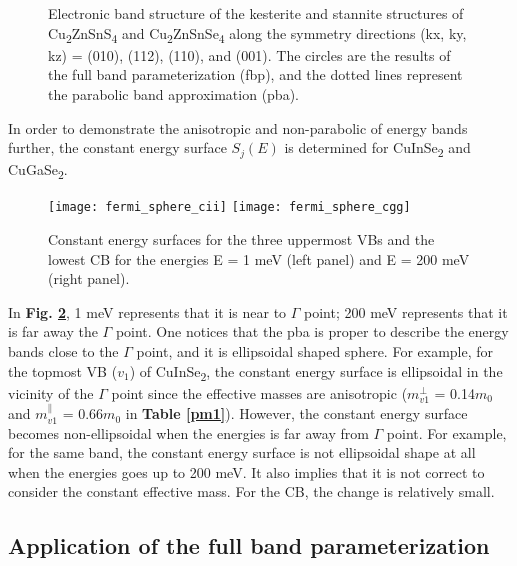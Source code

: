 \documentclass[a4paper, 12pt, titlepage,oneside,drop]{kthesis}
\begin{document}
\begin{figure}[H]
\begin{center}
     \end{center}
    \caption{ Electronic band structure of the kesterite and stannite structures of Cu\textsubscript{2}ZnSnS\textsubscript{4} and Cu\textsubscript{2}ZnSnSe\textsubscript{4} along the symmetry directions (kx, ky, kz) = (010), (112),
              (110), and (001). The circles are the results of the full band parameterization (fbp), and the dotted lines represent the parabolic band approximation (pba). }      
    \label{bandstruct1}
\end{figure}


In order to demonstrate the anisotropic and non-parabolic of energy bands further, the constant energy surface $S_j(E)$ is determined for CuInSe\textsubscript{2} and CuGaSe\textsubscript{2}.

\begin{figure}[H]
    \begin{center}
            \texttt{[image: fermi\_sphere\_cii]}
            \texttt{[image: fermi\_sphere\_cgg]}
     \end{center}
    \caption{Constant energy surfaces for the three uppermost VBs and the lowest CB for the energies E = 1 meV (left panel) and E = 200 meV (right panel).}
    \label{cse}
\end{figure}

In \textbf{Fig. \ref{cse}}, 1 meV represents that it is near to $\Gamma$ point; 200 meV represents that it is far away the $\Gamma$ point.
One notices that the pba is proper to describe the energy bands close to the $\Gamma$ point, and it is ellipsoidal shaped sphere. For example,
for the topmost VB ($v_1$) of CuInSe\textsubscript{2}, the constant energy surface is ellipsoidal in the vicinity of the $\Gamma$ point since the effective
masses are anisotropic ($m_{v1}^{\perp}$ = 0.14$m_0$ and $m_{v1}^{\parallel}$ = 0.66$m_0$ in \textbf{Table \ref{pm1}}). However, the constant energy surface becomes non-ellipsoidal when the energies 
is far away from $\Gamma$ point. For example, for the same band, the constant energy surface is not ellipsoidal shape at all when the energies goes up to 200 meV. It also implies that it is not correct to consider the constant 
effective mass. For the CB, the change is relatively small.

\subsection{Application of the full band parameterization}
\end{document}

